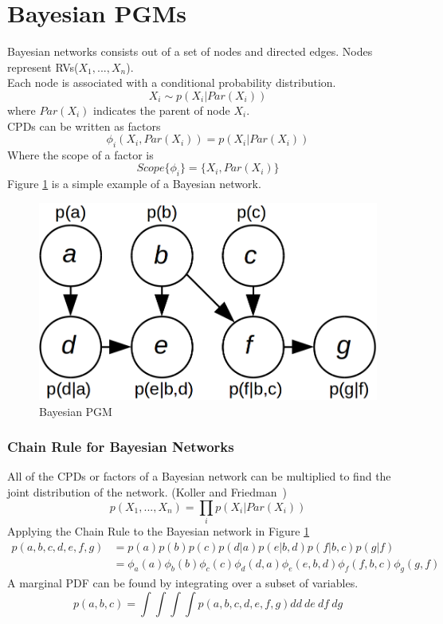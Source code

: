 \documentclass[12pt,oneside,openany,a4paper, %
afrikaans,english,
]{memoir}
\numberwithin{equation}{chapter}
\begin{document}
\section{Bayesian PGMs}
Bayesian networks consists out of a set of nodes and directed edges. Nodes represent RVs($X_1, ..., X_n$).\\
Each node is associated with a conditional probability distribution.
\begin{equation}
X_i \sim p(X_i|Par(X_i))
\end{equation}
where $Par(X_i)$ indicates the parent of node $X_i$.\\
CPDs can be written as factors
\begin{equation}
\phi_i(X_i, Par(X_i)) = p(X_i|Par(X_i))
\end{equation}
Where the scope of a factor is
\begin{equation}
Scope\{\phi_i\} = \{X_i, Par(X_i)\}
\end{equation}
Figure \ref{fig:bays_pgm} is a simple example of a Bayesian network.
\begin{figure}[H]
  \includegraphics[width=0.6\linewidth]{Figures/bayesian_pgm.png}
  \centering
  \caption{Bayesian PGM}
  \label{fig:bays_pgm}
\end{figure}
\subsubsection{Chain Rule for Bayesian Networks}
All of the CPDs or factors of a Bayesian network can be multiplied to find the joint distribution of the network. (Koller and Friedman~\citep{koller})
\begin{equation}
p(X_1, ..., X_n) = \prod_i p(X_i|Par(X_i))
\end{equation}
Applying the Chain Rule to the Bayesian network in Figure \ref{fig:bays_pgm}
\begin{equation}
\begin{split}
p(a,b,c,d,e,f,g) & = p(a)p(b)p(c)p(d|a)p(e|b,d)p(f|b,c)p(g|f)\\
& = \phi_a(a)\phi_b(b)\phi_c(c)\phi_d(d,a)\phi_e(e,b,d)\phi_f(f,b,c)\phi_g(g,f)
\end{split}
\end{equation}
A marginal PDF can be found by integrating over a subset of variables.
\begin{equation}
p(a,b,c) = \int\int\int\int p(a,b,c,d,e,f,g)dd\ de\ df\ dg
\end{equation}
\end{document}
